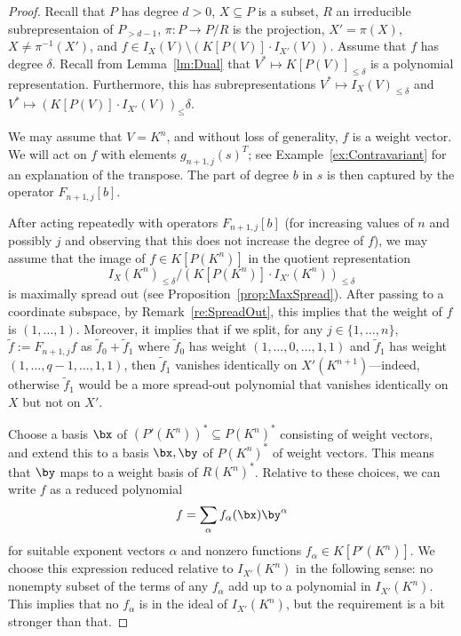\documentclass{amsart}
\begin{document}
\begin{proof}
Recall that $P$ has degree $d>0$, $X \subseteq P$ is a subset,
$R$ an irreducible subrepresentaion of $P_{>d-1}$, $\pi:P \to P/R$
is the projection, $X'=\pi(X)$, $X \neq \pi^{-1}(X')$, and $f \in
I_X(V) \setminus (K[P(V)] \cdot I_{X'}(V))$. Assume that $f$ has
degree $\delta$. Recall from Lemma~\ref{lm:Dual} that $V^* \mapsto
K[P(V)]_{\leq \delta}$ is a polynomial representation. Furthermore,
this has subrepresentations $V^* \mapsto I_X(V)_{\leq \delta}$ and
$V^* \mapsto (K[P(V)] \cdot I_{X'}(V))_\leq \delta$. 

We may assume that $V=K^n$, and without loss of generality, $f$ is a
weight vector. We will act on $f$ with elements $g_{n+1,j}(s)^T$; see
Example~\ref{ex:Contravariant} for an explanation of the transpose.  The
part of degree $b$ in $s$ is then captured by the operator $F_{n+1,j}[b]$.

After acting repeatedly with operators $F_{n+1,j}[b]$ (for increasing
values of $n$ and possibly $j$ and observing that this does
not increase the degree of $f$), we may assume that the image of $f
\in K[P(K^n)]$ in the quotient representation 
\[ I_X(K^n)_{\leq \delta}
/(K[P(K^n)] \cdot I_{X'}(K^n))_{\leq \delta} \] 
is maximally spread
out (see Proposition~\ref{prop:MaxSpread}). After passing to a coordinate subspace,
by Remark~\ref{re:SpreadOut}, this implies that the weight of $f$
is $(1,\ldots,1)$. Moreover, it implies that if we split, for any
$j \in \{1,\ldots,n\}$, $\tilde{f}:=F_{n+1,j} f$ as $\tilde{f}_0 +
\tilde{f}_1$ where $\tilde{f}_0$ has weight $(1,\ldots,0,\ldots,1,1)$ and
$\tilde{f}_1$ has weight $(1,\ldots,q-1,\ldots,1,1)$, then $\tilde{f}_1$
vanishes identically on $X'(K^{n+1})$---indeed, otherwise $\tilde{f}_1$
would be a more spread-out polynomial that vanishes identically on $X$
but not on $X'$.

Choose a basis $\bx$ of $(P'(K^n))^* \subseteq P(K^n)^*$ consisting
of weight vectors, and extend this to a basis $\bx,\by$ of $P(K^n)^*$
of weight vectors. This means that $\by$ maps to a weight basis of
$R(K^n)^*$. Relative to these choices, we can write $f$ as a
reduced polynomial 
\begin{equation}
\label{eq:Decomp1}
f = \sum_\alpha f_\alpha(\bx) \by^\alpha 
\end{equation}
for suitable exponent vectors $\alpha$ and nonzero functions
$f_{\alpha} \in K[P'(K^n)]$. We choose this expression reduced relative to
$I_{X'}(K^n)$ in the following sense: no nonempty subset of the terms of
any $f_{\alpha}$ add up to a polynomial in $I_{X'}(K^n)$.
This implies that no $f_{\alpha}$ is in the ideal of $I_{X'}(K^n)$,
but the requirement is a bit stronger than that.


\end{proof}
\end{document}
